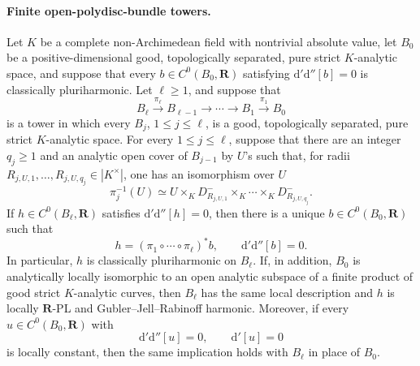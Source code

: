 \paragraph{Finite open-polydisc-bundle towers.}
\begin{corollary}
\label{cor:p062-iterated-open-polydisc-bundle-regularity}
Let \(K\) be a complete non-Archimedean field with nontrivial absolute
value, let \(B_0\) be a positive-dimensional good, topologically separated,
pure strict \(K\)-analytic space, and suppose that every
\(b\in C^0(B_0,\mathbf R)\) satisfying
\(\mathrm d'\mathrm d''[b]=0\) is classically pluriharmonic.  Let
\(\ell\geq1\), and suppose that
\[
 B_\ell\xrightarrow{\pi_\ell}B_{\ell-1}
 \longrightarrow\cdots\longrightarrow B_1
 \xrightarrow{\pi_1}B_0
\]
is a tower in which every \(B_j\), \(1\leq j\leq\ell\), is a good,
topologically separated, pure strict \(K\)-analytic space.  For every
\(1\leq j\leq\ell\), suppose that there are an integer \(q_j\geq1\) and
an analytic open cover of \(B_{j-1}\) by \(U\)'s such that, for radii
\(R_{j,U,1},\ldots,R_{j,U,q_j}\in|K^\times|\), one has an isomorphism
over \(U\)
\[
 \pi_j^{-1}(U)\simeq
 U\times_KD_{R_{j,U,1}}^-\times_K\cdots\times_KD_{R_{j,U,q_j}}^-.
\]
If \(h\in C^0(B_\ell,\mathbf R)\) satisfies
\(\mathrm d'\mathrm d''[h]=0\), then there is a unique
\(b\in C^0(B_0,\mathbf R)\) such that
\[
 h=(\pi_1\circ\cdots\circ\pi_\ell)^*b,
 \qquad
 \mathrm d'\mathrm d''[b]=0.
\]
In particular, \(h\) is classically pluriharmonic on \(B_\ell\).
If, in addition, \(B_0\) is analytically locally isomorphic to an open
analytic subspace of a finite product of good strict \(K\)-analytic curves,
then \(B_\ell\) has the same local description and \(h\) is locally
\(\mathbf R\)-PL and Gubler--Jell--Rabinoff harmonic.
Moreover, if every \(u\in C^0(B_0,\mathbf R)\) with
\[
             \mathrm d'\mathrm d''[u]=0,
             \qquad \mathrm d'[u]=0
\]
is locally constant, then the same implication holds with \(B_\ell\) in
place of \(B_0\).
\end{corollary}

